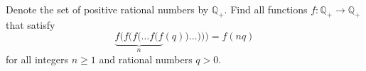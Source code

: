 Denote the set of positive rational numbers by $\mathbb{Q}_{+}$. Find all functions $f: \mathbb{Q}_{+}\rightarrow \mathbb{Q}_{+}$ that satisfy
$$\underbrace{f(f(f(\dots f(f}_{n}(q))\dots )))=f(nq)$$for all integers $n\ge 1$ and rational numbers $q>0$.